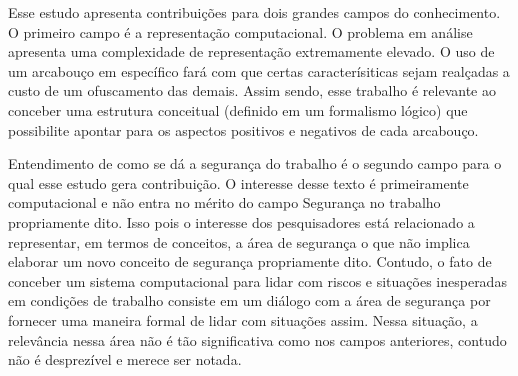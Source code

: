Esse estudo apresenta contribuições para dois grandes campos do conhecimento. O primeiro campo é a representação computacional. O problema em análise apresenta uma complexidade de representação extremamente elevado. O uso de um arcabouço em específico fará com que certas caracterísiticas sejam realçadas a custo de um ofuscamento das demais. Assim sendo, esse trabalho é relevante ao conceber uma estrutura conceitual (definido em um formalismo lógico) que possibilite apontar para os aspectos positivos e negativos de cada arcabouço. 

Entendimento de como se dá a segurança do trabalho é o segundo campo para o qual esse estudo gera contribuição. O interesse desse texto é primeiramente computacional e não entra no mérito do campo Segurança no trabalho propriamente dito. Isso pois o interesse dos pesquisadores está relacionado a representar, em termos de conceitos, a área de segurança o que não implica elaborar um novo conceito de segurança propriamente dito. Contudo, o fato de conceber um sistema computacional para lidar com riscos e situações inesperadas em condições de trabalho consiste em um diálogo com a área de segurança por fornecer uma maneira formal de lidar com situações assim. Nessa situação, a relevância nessa área não é tão significativa como nos campos anteriores, contudo não é desprezível e merece ser notada.